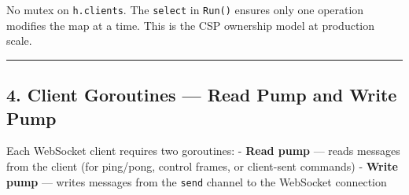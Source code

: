 \documentclass[
]{article}
\begin{document}
No mutex on \texttt{h.clients}. The \texttt{select} in \texttt{Run()}
ensures only one operation modifies the map at a time. This is the CSP
ownership model at production scale.

\begin{center}\rule{0.5\linewidth}{0.5pt}\end{center}

\hypertarget{client-goroutines-read-pump-and-write-pump}{%
\subsection{4. Client Goroutines --- Read Pump and Write
Pump}\label{client-goroutines-read-pump-and-write-pump}}

Each WebSocket client requires two goroutines: - \textbf{Read pump} ---
reads messages from the client (for ping/pong, control frames, or
client-sent commands) - \textbf{Write pump} --- writes messages from the
\texttt{send} channel to the WebSocket connection
\end{document}
